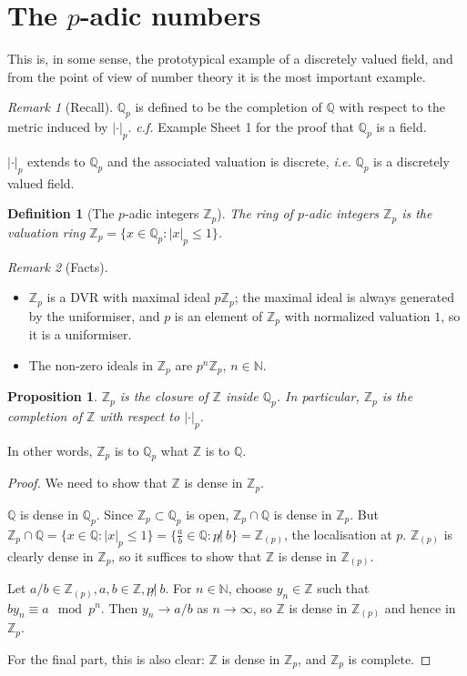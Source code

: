 \documentclass[]{article}
\theoremstyle{custhm}
\theoremstyle{cusdef}
\newtheorem{defin}[theorem]{Definition}
\theoremstyle{custhm}
\theoremstyle{custhm}
\theoremstyle{custhm}
\newtheorem{prop}[theorem]{Proposition}
\theoremstyle{custhm}
\theoremstyle{cusdef}
\theoremstyle{remark}
\newtheorem*{remark*}{Remark}
\newcommand{\N}{\mathbb{N}}
\newcommand{\Z}{\mathbb{Z}}
\newcommand{\Q}{\mathbb{Q}}
\newcommand{\ra}{\rightarrow}
\renewcommand{\it}[1]{\textit{#1}}
\renewcommand{\value}{|\cdot|}
\begin{document}

\section{The $p$-adic numbers}

This is, in some sense, the prototypical example of a discretely valued field, and from the point of view of number theory it is the most important example.

\begin{remark*}[Recall]
$\Q_p$ is defined to be the completion of $\Q$ with respect to the metric induced by $\value_p$. \it{c.f.} Example Sheet 1 for the proof that $\Q_p$ is a field.

$\value_p$ extends to $\Q_p$ and the associated valuation is discrete, \it{i.e.} $\Q_p$ is a discretely valued field.
\end{remark*}

\begin{defin}[The $p$-adic integers $\Z_p$]
The ring of $p$-adic integers $\Z_p$ is the valuation ring $\Z_p = \{x\in\Q_p : |x|_p \le 1\}$.
\end{defin}
\begin{remark*}[Facts]
\begin{itemize}
	\item $\Z_p$ is a DVR with maximal ideal $p\Z_p$; the maximal ideal is always generated by the uniformiser, and $p$ is an element of $\Z_p$ with normalized valuation $1$, so it is a uniformiser.
	\item The non-zero ideals in $\Z_p$ are $p^n\Z_p$, $n\in\N$.
\end{itemize}
\end{remark*}
\begin{prop}
$\Z_p$ is the closure of $\Z$ inside $\Q_p$. In particular, $\Z_p$ is the completion of $\Z$ with respect to $\value_p$.
\end{prop}
In other words, $\Z_p$ is to $\Q_p$ what $\Z$ is to $\Q$.
\begin{proof}
We need to show that $\Z$ is dense in $\Z_p$.

$\Q$ is dense in $\Q_p$. Since $\Z_p \subset \Q_p$ is open, $\Z_p \cap \Q$ is dense in $\Z_p$. But $\Z_p \cap \Q =\{x\in \Q : |x|_p \le 1 \} = \{\frac{a}{b}\in \Q : p\not|\ b\} = \Z_{(p)}$, the localisation at $p$. $\Z_{(p)}$ is clearly dense in $\Z_p$, so it suffices to show that $\Z$ is dense in $\Z_{(p)}$.

Let $a/b\in \Z_{(p)}, a,b\in\Z,p\not|\ b$. For $n\in\N$, choose $y_n\in \Z$ such that $by_n \equiv a\mod p^n$. Then $y_n\ra a/b$ as $n\ra\infty$, so $\Z$ is dense in $\Z_{(p)}$ and hence in $\Z_p$.

For the final part, this is also clear: $\Z$ is dense in $\Z_p$, and $\Z_p$ is complete.
\end{proof}
\end{document}
